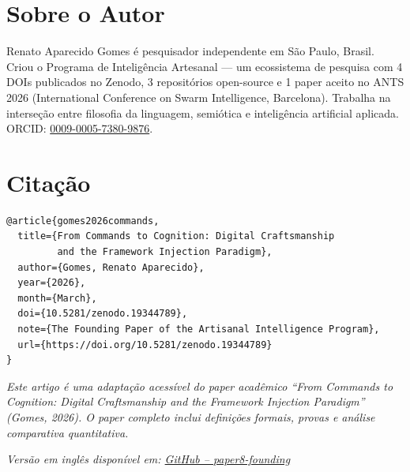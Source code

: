 \documentclass[12pt,a4paper]{article}
\begin{document}
\section*{Sobre o Autor}

Renato Aparecido Gomes é pesquisador independente em São Paulo, Brasil. Criou o Programa de Inteligência Artesanal --- um ecossistema de pesquisa com 4 DOIs publicados no Zenodo, 3 repositórios open-source e 1 paper aceito no ANTS 2026 (International Conference on Swarm Intelligence, Barcelona). Trabalha na interseção entre filosofia da linguagem, semiótica e inteligência artificial aplicada. ORCID: \href{https://orcid.org/0009-0005-7380-9876}{0009-0005-7380-9876}.

\section*{Citação}

\begin{verbatim}
@article{gomes2026commands,
  title={From Commands to Cognition: Digital Craftsmanship
         and the Framework Injection Paradigm},
  author={Gomes, Renato Aparecido},
  year={2026},
  month={March},
  doi={10.5281/zenodo.19344789},
  note={The Founding Paper of the Artisanal Intelligence Program},
  url={https://doi.org/10.5281/zenodo.19344789}
}
\end{verbatim}

\medskip
\noindent\emph{Este artigo é uma adaptação acessível do paper acadêmico ``From Commands to Cognition: Digital Craftsmanship and the Framework Injection Paradigm'' (Gomes, 2026). O paper completo inclui definições formais, provas e análise comparativa quantitativa.}

\medskip
\noindent\emph{Versão em inglês disponível em: \href{https://github.com/RAG7782/papers}{GitHub -- paper8-founding}}
\end{document}
